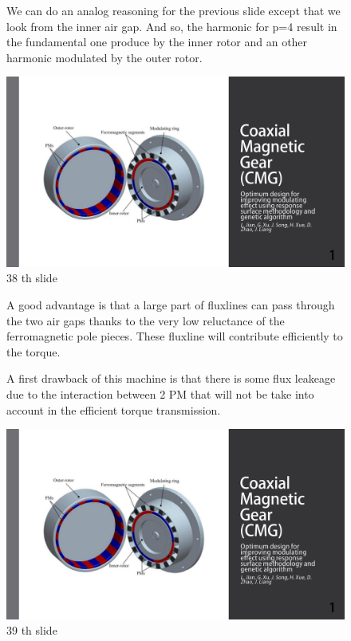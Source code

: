 \begin{figure}[H]
    \begin{minipage}{.45\linewidth}
    We can do an analog reasoning for the previous slide except that we look from the inner air gap. And so, the harmonic for p=4 result in the fundamental one produce by the inner rotor and an other harmonic modulated by the outer rotor.
 
       
    \end{minipage}
    \hfill%
    \begin{minipage}[c]{.45\linewidth}
        \centering
        \includegraphics[page={38},width=\textwidth]{LELEC2311.allow.pdf}
        \caption{38 th slide}
    \end{minipage}
\end{figure}

\begin{figure}[H]
    \begin{minipage}{.45\linewidth}
    A good advantage is that a large part of fluxlines can pass through the two air gaps thanks to the very low reluctance of the ferromagnetic pole pieces. These fluxline will contribute efficiently to the torque.

 A first drawback of this machine is that there is some flux leakeage due to the interaction between 2 PM that will not be take into account in the efficient torque transmission.
 
       
    \end{minipage}
    \hfill%
    \begin{minipage}[c]{.45\linewidth}
        \centering
        \includegraphics[page={39},width=\textwidth]{LELEC2311.allow.pdf}
        \caption{39 th slide}
    \end{minipage}
\end{figure}

